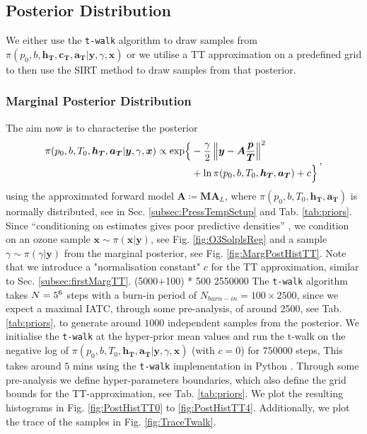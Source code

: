 \subsection{Posterior Distribution}

We either use the \texttt{t-walk} algorithm \cite{christen2010general} to draw samples from $\pi(p_0,b,\bm{h_T},\bm{c_T},\bm{a_T} | \bm{y}, \gamma, \bm{x})$ or we utilise a TT approximation on a predefined grid to then use the SIRT method to draw samples from that posterior.


\subsubsection{Marginal Posterior Distribution}



The aim now is to characterise the posterior
\begin{align}
	\begin{split}
		\pi(p_0,b,T_0,\bm{h_T},\bm{a_T} | \bm{y}, \gamma, \bm{x}) \propto  \exp\Bigl\{ & -\frac{\gamma}{2} \left\Vert \bm{y}- \bm{A} \frac{\bm{p}}{\bm{T}}  \right\Vert^2 \\ &+ \ln{\pi(p_0,b,T_0,\bm{h_T},\bm{a_T})  + c \Bigr\}  }
	\end{split} \, ,
	\label{eq:postPT}
\end{align}
using the approximated forward model $\bm{A} \coloneqq \bm{M}\bm{A}_L$, where $\pi(p_0,b,T_0,\bm{h_T},\bm{a_T})$ is normally distributed, see in Sec. \ref{subsec:PressTempSetup} and Tab. \ref{tab:priors}.
Since “conditioning on estimates gives poor predictive densities” \cite{tan2016LecNot}, we condition on an ozone sample $\bm{x} \sim \pi(\bm{x}|\bm{y})$, see Fig. \ref{fig:O3SolplsReg} and a sample $\gamma \sim \pi(\gamma| \bm{y})$ from the marginal posterior, see Fig. \ref{fig:MargPostHistTT}.
Note that we introduce a "normalisation constant" $c$ for the TT approximation, similar to Sec. \ref{subsec:firstMargTT}.
(5000+100) * 500
2550000
The \texttt{t-walk} \cite{christen2010general} algorithm takes $N = 5 \time 10^6$ steps with a burn-in period of $N_{burn-in} = 100 \times 2500 $, since we expect a maximal IATC, through some pre-analysis, of around 2500, see Tab. \ref{tab:priors}, to generate around $1000$ independent samples from the posterior.
We initialise the \texttt{t-walk} at the hyper-prior mean values and run the t-walk on the negative log of $\pi(p_0,b,T_0,\bm{h_T},\bm{a_T} | \bm{y}, \gamma, \bm{x}) $ (with $c=0$) for $750000$ steps,
This takes around $5$ mins using the \texttt{t-walk} implementation in Python \cite{christentwalkaccess}.
Through some pre-analysis we define hyper-parameters boundaries, which also define the grid bounds for the TT-approximation, see Tab. \ref{tab:priors}.
We plot the resulting histograms in Fig. \ref{fig:PostHistTT0} to \ref{fig:PostHistTT4}.
Additionally, we plot the trace of the samples in Fig. \ref{fig:TraceTwalk}.

